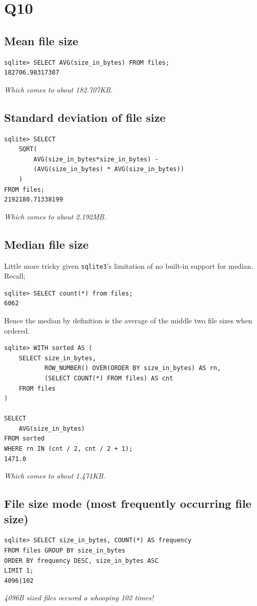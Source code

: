 \documentclass{article}
\begin{document}
\section*{Q10}
\subsection*{Mean file size}
\begin{verbatim}
sqlite> SELECT AVG(size_in_bytes) FROM files;
182706.98317387
\end{verbatim}
\textit{Which comes to about 182.707KB.}

\subsection*{Standard deviation of file size}
\begin{verbatim}
sqlite> SELECT 
    SQRT(
        AVG(size_in_bytes*size_in_bytes) - 
        (AVG(size_in_bytes) * AVG(size_in_bytes))
    )
FROM files;
2192180.71338199
\end{verbatim}
\textit{Which comes to about 2.192MB.}

\subsection*{Median file size}
Little more tricky given \texttt{sqlite3}'s limitation of no built-in support for median. Recall;
\begin{verbatim}
sqlite> SELECT count(*) from files;
6062
\end{verbatim}
Hence the median by definition is the average of the middle two file sizes when ordered.
\begin{verbatim}
sqlite> WITH sorted AS (
    SELECT size_in_bytes,
           ROW_NUMBER() OVER(ORDER BY size_in_bytes) AS rn,
           (SELECT COUNT(*) FROM files) AS cnt
    FROM files
)

SELECT 
    AVG(size_in_bytes)
FROM sorted
WHERE rn IN (cnt / 2, cnt / 2 + 1);
1471.0
\end{verbatim}
\textit{Which comes to about 1.471KB.}

\subsection*{File size mode (most frequently occurring file size)}
\begin{verbatim}
sqlite> SELECT size_in_bytes, COUNT(*) AS frequency
FROM files GROUP BY size_in_bytes
ORDER BY frequency DESC, size_in_bytes ASC
LIMIT 1;
4096|102
\end{verbatim}
\textit{4096B sized files occured a whooping 102 times!}
\end{document}
